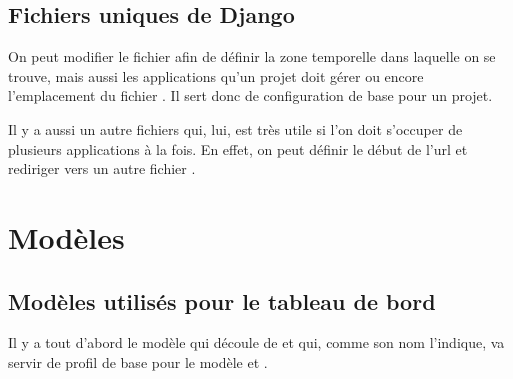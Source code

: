 \documentclass[a4paper,10pt,french]{sphinxmanual}
\begin{document}
\subsection{Fichiers uniques de Django}
\label{documentation:fichiers-uniques-de-django}
On peut modifier le fichier  afin de définir la zone temporelle
dans laquelle on se trouve, mais aussi les applications qu'un projet doit
gérer ou encore l'emplacement du fichier . Il sert donc de
configuration de base pour un projet.

Il y a aussi un autre fichiers  qui, lui, est très utile si l'on doit
s'occuper de plusieurs applications à la fois. En effet, on peut définir le
début de l'url et rediriger vers un autre fichier .


\section{Modèles}
\label{documentation:modeles}

\subsection{Modèles utilisés pour le tableau de bord}
\label{documentation:modeles-utilises-pour-le-tableau-de-bord}
Il y a tout d'abord le modèle  qui découle de  et qui,
comme son nom l'indique, va servir de profil de base pour le modèle 
et .
\end{document}
